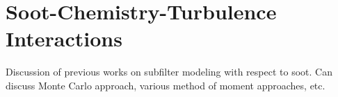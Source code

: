 \section{Soot-Chemistry-Turbulence Interactions}
\label{sec:intro:scti}

Discussion of previous works on subfilter modeling with respect to soot. Can discuss Monte Carlo approach, various method of moment approaches, etc.
